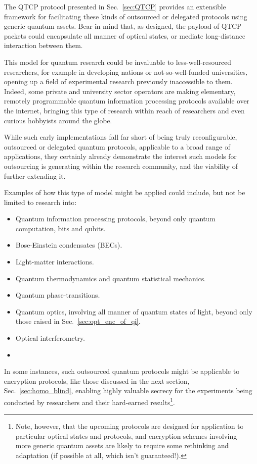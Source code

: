\documentclass[aps, rmp, twocolumn, amsmath, amssymb, nofootinbib, superscriptaddress, longbibliography, floatfix, table-of-contents, eqsecnum]{revtex4-1}
\newcommand{\comment}[1]{{\color{blue}{\textbf{#1}}}}
\begin{document}
The QTCP protocol presented in Sec.~\ref{sec:QTCP} provides an extensible framework for facilitating these kinds of outsourced or delegated protocols using generic quantum assets. Bear in mind that, as designed, the payload of QTCP packets could encapsulate all manner of optical states, or mediate long-distance interaction between them.

This model for quantum research could be invaluable to less-well-resourced researchers, for example in developing nations or not-so-well-funded universities, opening up a field of experimental research previously inaccessible to them. Indeed, some private and university sector operators are making elementary, remotely programmable quantum information processing protocols available over the internet, bringing this type of research within reach of researchers and even curious hobbyists around the globe.

While such early implementations fall far short of being truly reconfigurable, outsourced or delegated quantum protocols, applicable to a broad range of applications, they certainly already demonstrate the interest such models for outsourcing is generating within the research community, and the viability of further extending it.

Examples of how this type of model might be applied could include, but not be limited to research into:
\begin{itemize}
	\item Quantum information processing protocols, beyond only quantum computation, bits and qubits.
	\item Bose-Einstein condensates (BECs).
	\item Light-matter interactions.
	\item Quantum thermodynamics and quantum statistical mechanics.
	\item Quantum phase-transitions.
	\item Quantum optics, involving all manner of quantum states of light, beyond only those raised in Sec.~\ref{sec:opt_enc_of_qi}.
	\item Optical interferometry.
	\item \comment{More!}
\end{itemize}

In some instances, such outsourced quantum protocols might be applicable to encryption protocols, like those discussed in the next section, Sec.~\ref{sec:homo_blind}, enabling highly valuable secrecy for the experiments being conducted by researchers and their hard-earned results\footnote{Note, however, that the upcoming protocols are designed for application to particular optical states and protocols, and encryption schemes involving more generic quantum assets are likely to require some rethinking and adaptation (if possible at all, which isn't guaranteed!).}.
\end{document}

